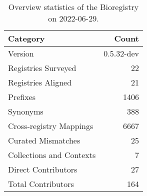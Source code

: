 \begin{table}
\centering
\caption{Overview statistics of the Bioregistry on 2022-06-29.}
\label{tab:bioregistry-summary}
\begin{tabular}{lr}
\toprule
                Category &      Count \\
\midrule
                 Version & 0.5.32-dev \\
     Registries Surveyed &         22 \\
      Registries Aligned &         21 \\
                Prefixes &       1406 \\
                Synonyms &        388 \\
 Cross-registry Mappings &       6667 \\
      Curated Mismatches &         25 \\
Collections and Contexts &          7 \\
     Direct Contributors &         27 \\
      Total Contributors &        164 \\
\bottomrule
\end{tabular}
\end{table}
